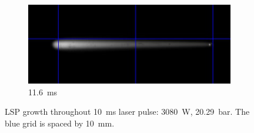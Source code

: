 \begin{figure}[h]
    \hfill
    \begin{subfigure}[t]{0.47\textwidth}
        \centering
        \includegraphics[width=\textwidth]{assets/5 results/1msFrames/116.jpg}
        \caption{\qty{11.6}{ms}}
        \label{fig:growth_frames_116}
    \end{subfigure}
    \caption[LSP growth throughout \qty{10}{ms} laser pulse]{LSP growth throughout \qty{10}{ms} laser pulse: \qty{3080}{W}, \qty{20.29}{bar}. The blue grid is spaced by \qty{10}{mm}. }
    \label{fig:growth_frames}
\end{figure}